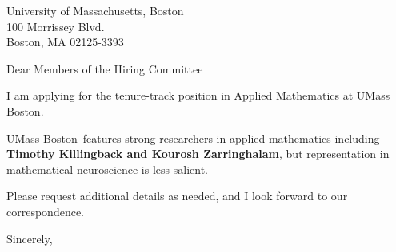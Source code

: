 




	
	
	\def\School{UMass Boston}
	
	\begin{letter}
		{University of Massachusetts, Boston\\
			100 Morrissey Blvd.\\
			Boston, MA 02125-3393
		}
		
		\opening{Dear Members of the Hiring Committee}
		
		
		I am applying for the tenure-track position in Applied Mathematics at \School. 
		
		\School~features strong researchers in applied mathematics including \textbf{Timothy Killingback and Kourosh Zarringhalam}, but representation in mathematical neuroscience is less salient. 
		
		
		
		
		
		Please request additional details as needed, and I look forward to our correspondence.
		
		\closing{Sincerely,}
	\end{letter}
